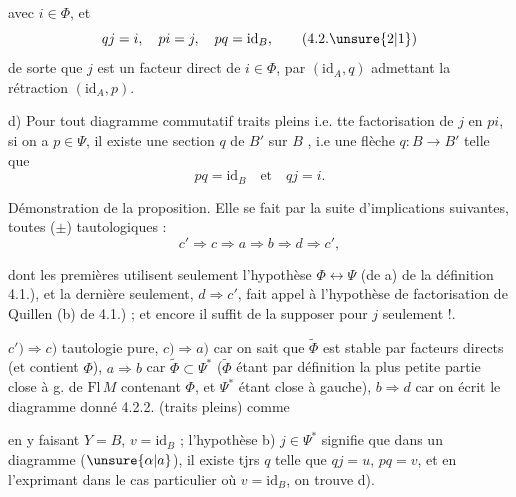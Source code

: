 avec $i\in\Phi$, et
\[
qj=i,\quad pi=j,\quad pq=\mathrm{id}_B,
\tag*{(4.2.\unsure{2|1})}
\]
de sorte que $j$ est un facteur direct de $i\in\Phi$,
par $(\mathrm{id}_A,q)$ admettant la rétraction $(\mathrm{id}_A,p)$.

d) Pour tout diagramme commutatif traits pleins
i.e. tte factorisation de $j$ en $pi$, si on a
$p\in\Psi$, il existe une section $q$ de $B'$ sur $B$ ,
i.e une flèche $q:B\longrightarrow B'$ telle que
\[
pq=\mathrm{id}_B\quad\text{et}\quad qj=i.
\]

Démonstration de la proposition. Elle se fait par la
suite d'implications suivantes, toutes ($\pm$) tautologiques :
\[
c'\Longrightarrow c\Longrightarrow a\Longrightarrow b\Longrightarrow d\Longrightarrow c',
\]

dont les  premières utilisent seulement
l'hypothèse $\Phi\longleftrightarrow\Psi$ (de a) de la définition
4.1.), et la dernière seulement, $d\Rightarrow c'$, fait appel
à l'hypothèse de factorisation de Quillen (b) de
4.1.) ; et encore il suffit de la supposer pour $j$ seulement !.

$c')\Rightarrow c)$ tautologie pure, $c)\Rightarrow a)$ car on sait
que $\widetilde\Phi$ est stable par facteurs directs (et contient $\Phi$),
$a\Rightarrow b$ car $\widetilde\Phi\subset\Psi^*$ ($\widetilde\Phi$ étant par définition la plus
petite partie close à g. de $\mathrm{Fl}\,M$ contenant $\Phi$,
et $\Psi^*$ étant close à gauche), $b\Rightarrow d$ car on écrit
le diagramme donné 4.2.2. (traits pleins)
comme

en y faisant  $Y=B$, $v=\mathrm{id}_B$  ;
l'hypothèse b) $j\in\Psi^*$ signifie que dans un diagramme  ($\unsure{\alpha|a}$), il
existe tjrs $q$ telle que $qj=u$, $pq=v$,
et en l'exprimant dans le cas particulier
où $v=\mathrm{id}_B$, on trouve d).

